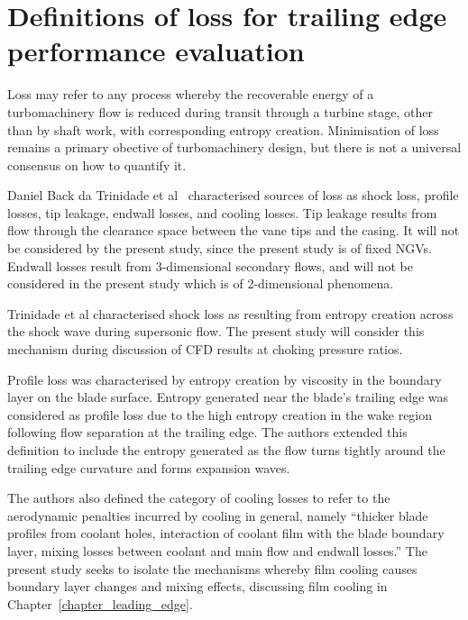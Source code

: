 \documentclass[a4paper, 11pt, twoside]{report}
\begin{document}
\section{Definitions of loss for trailing edge performance evaluation}

Loss may refer to any process whereby the recoverable energy of a turbomachinery flow is reduced during transit through a turbine stage, other than by shaft work, with corresponding entropy creation. Minimisation of loss remains a primary obective of turbomachinery design, but there is not a universal consensus on how to quantify it.

Daniel Back da Trinidade et al~\cite{trinidade_loss} characterised sources of loss as shock loss, profile losses, tip leakage, endwall losses, and cooling losses. Tip leakage results from flow through the clearance space between the vane tips and the casing. It will not be considered by the present study, since the present study is of fixed NGVs. Endwall losses result from 3-dimensional secondary flows, and will not be considered in the present study which is of 2-dimensional phenomena.

Trinidade et al characterised shock loss as resulting from entropy creation across the shock wave during supersonic flow. The present study will consider this mechanism during discussion of CFD results at choking pressure ratios.

Profile loss was characterised by entropy creation by viscosity in the boundary layer on the blade surface. Entropy generated near the blade's trailing edge was considered as profile loss due to the high entropy creation in the wake region following flow separation at the trailing edge. The authors extended this definition to include the entropy generated as the flow turns tightly around the trailing edge curvature and forms expansion waves.

The authors also defined the category of cooling losses to refer to the aerodynamic penalties incurred by cooling in general, namely ``thicker blade profiles from coolant holes, interaction of coolant film with the blade boundary layer, mixing losses between coolant and main flow and endwall losses.'' The present study seeks to isolate the mechanisms whereby film cooling causes boundary layer changes and mixing effects, discussing film cooling in Chapter~\ref{chapter_leading_edge}.
\end{document}
